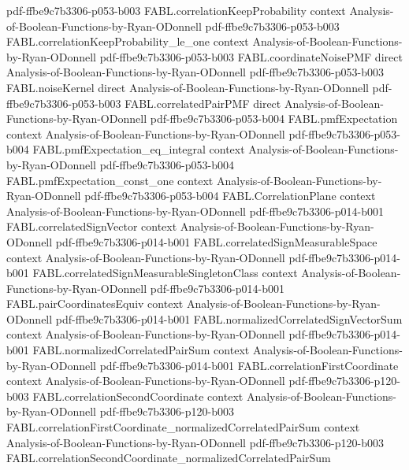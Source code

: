 \begin{theorem}
  {pdf-ffbe9c7b3306-p053-b003}
\proofstep
  {FABL.correlationKeepProbability}
  {context}
  {Analysis-of-Boolean-Functions-by-Ryan-ODonnell}
  {pdf-ffbe9c7b3306-p053-b003}
\proofstep
  {FABL.correlationKeepProbability_le_one}
  {context}
  {Analysis-of-Boolean-Functions-by-Ryan-ODonnell}
  {pdf-ffbe9c7b3306-p053-b003}
\proofstep
  {FABL.coordinateNoisePMF}
  {direct}
  {Analysis-of-Boolean-Functions-by-Ryan-ODonnell}
  {pdf-ffbe9c7b3306-p053-b003}
\proofstep
  {FABL.noiseKernel}
  {direct}
  {Analysis-of-Boolean-Functions-by-Ryan-ODonnell}
  {pdf-ffbe9c7b3306-p053-b003}
\proofstep
  {FABL.correlatedPairPMF}
  {direct}
  {Analysis-of-Boolean-Functions-by-Ryan-ODonnell}
  {pdf-ffbe9c7b3306-p053-b004}
\proofstep
  {FABL.pmfExpectation}
  {context}
  {Analysis-of-Boolean-Functions-by-Ryan-ODonnell}
  {pdf-ffbe9c7b3306-p053-b004}
\proofstep
  {FABL.pmfExpectation_eq_integral}
  {context}
  {Analysis-of-Boolean-Functions-by-Ryan-ODonnell}
  {pdf-ffbe9c7b3306-p053-b004}
\proofstep
  {FABL.pmfExpectation_const_one}
  {context}
  {Analysis-of-Boolean-Functions-by-Ryan-ODonnell}
  {pdf-ffbe9c7b3306-p053-b004}
\proofstep
  {FABL.CorrelationPlane}
  {context}
  {Analysis-of-Boolean-Functions-by-Ryan-ODonnell}
  {pdf-ffbe9c7b3306-p014-b001}
\proofstep
  {FABL.correlatedSignVector}
  {context}
  {Analysis-of-Boolean-Functions-by-Ryan-ODonnell}
  {pdf-ffbe9c7b3306-p014-b001}
\proofstep
  {FABL.correlatedSignMeasurableSpace}
  {context}
  {Analysis-of-Boolean-Functions-by-Ryan-ODonnell}
  {pdf-ffbe9c7b3306-p014-b001}
\proofstep
  {FABL.correlatedSignMeasurableSingletonClass}
  {context}
  {Analysis-of-Boolean-Functions-by-Ryan-ODonnell}
  {pdf-ffbe9c7b3306-p014-b001}
\proofstep
  {FABL.pairCoordinatesEquiv}
  {context}
  {Analysis-of-Boolean-Functions-by-Ryan-ODonnell}
  {pdf-ffbe9c7b3306-p014-b001}
\proofstep
  {FABL.normalizedCorrelatedSignVectorSum}
  {context}
  {Analysis-of-Boolean-Functions-by-Ryan-ODonnell}
  {pdf-ffbe9c7b3306-p014-b001}
\proofstep
  {FABL.normalizedCorrelatedPairSum}
  {context}
  {Analysis-of-Boolean-Functions-by-Ryan-ODonnell}
  {pdf-ffbe9c7b3306-p014-b001}
\proofstep
  {FABL.correlationFirstCoordinate}
  {context}
  {Analysis-of-Boolean-Functions-by-Ryan-ODonnell}
  {pdf-ffbe9c7b3306-p120-b003}
\proofstep
  {FABL.correlationSecondCoordinate}
  {context}
  {Analysis-of-Boolean-Functions-by-Ryan-ODonnell}
  {pdf-ffbe9c7b3306-p120-b003}
\proofstep
  {FABL.correlationFirstCoordinate_normalizedCorrelatedPairSum}
  {context}
  {Analysis-of-Boolean-Functions-by-Ryan-ODonnell}
  {pdf-ffbe9c7b3306-p120-b003}
\proofstep
  {FABL.correlationSecondCoordinate_normalizedCorrelatedPairSum}

\end{theorem}
